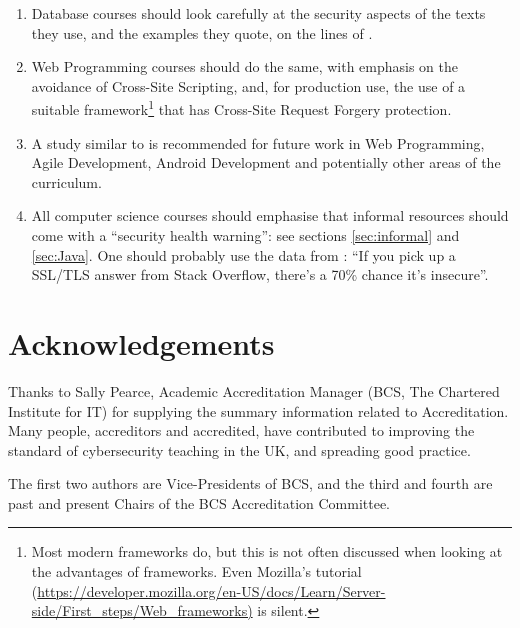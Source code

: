\documentclass[conference]{IEEEtran}
\begin{document}
\begin{enumerate}
\item Database courses should look carefully at the security aspects of the texts they use, and the examples they quote, on the lines of \cite{Drop2019}.
\item Web Programming courses should  do the same, with emphasis on the avoidance of Cross-Site Scripting, and, for production use, the use of a suitable framework\footnote{Most modern frameworks do, but this is not often discussed when looking at the advantages of frameworks. Even Mozilla's tutorial (\url{https://developer.mozilla.org/en-US/docs/Learn/Server-side/First_steps/Web_frameworks)} is silent.} that has Cross-Site Request Forgery protection. 
\item A study similar to \cite{Drop2019} is recommended for future work in Web Programming, Agile Development, Android Development and potentially other areas of the curriculum.
\item All computer science courses should emphasise that informal resources should come with a ``security health warning'': see sections \ref{sec:informal} and \ref{sec:Java}. One should probably use the data from \cite{Chenetal2019a}: ``If you pick up a SSL/TLS answer from Stack Overflow, there's a 70\% chance it's insecure''.
\end{enumerate}

\section*{Acknowledgements}
Thanks to Sally Pearce, Academic Accreditation Manager (BCS, The Chartered Institute for IT) for supplying the summary information related to Accreditation. Many people, accreditors and accredited, have contributed to improving the standard of cybersecurity teaching in the UK, and spreading good practice.
\par
The first two authors are Vice-Presidents of BCS, and the third and fourth are past and present Chairs of the BCS Accreditation Committee.



 
\end{document}
